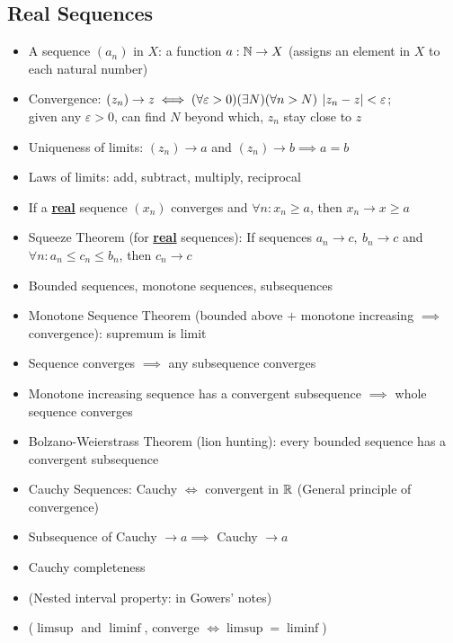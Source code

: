 \subsection*{Real Sequences}
\begin{itemize}
      \item A sequence $(a_n)$ in $X$: a function $a: \mathbb{N} \to X$ (assigns an element in $X$ to each natural number)
      \item Convergence: $(z_n) \to z \iff (\forall \varepsilon > 0)(\exists N)(\forall n>N) \: \left| z_n - z \right| < \varepsilon$; \\
            given any $\varepsilon > 0$, can find $N$ beyond which, $z_n$ stay close to $z$
      \item Uniqueness of limits: $(z_n) \to a$ and $(z_n) \to b \implies a = b$
      \item Laws of limits: add, subtract, multiply, reciprocal
      \item If a \underline{\textbf{real}} sequence $(x_n)$ converges and $ \forall n: x_n \geq a$, then $x_n \to x \geq a$
      \item Squeeze Theorem (for \underline{\textbf{real}} sequences): If sequences $a_n \to c , \: b_n \to c$ and $\forall n: a_n \leq c_n \leq b_n $, then $c_n \to c$
      \item Bounded sequences, monotone sequences, subsequences
      \item Monotone Sequence Theorem (bounded above $+$ monotone increasing $\implies$ convergence): supremum is limit
      \item Sequence converges $\implies$ any subsequence converges
      \item Monotone increasing sequence has a convergent subsequence $\implies$ whole sequence converges
      \item Bolzano-Weierstrass Theorem (lion hunting): every bounded sequence has a convergent subsequence
      \item Cauchy Sequences: Cauchy $\iff$ convergent in $\mathbb{R}$ (General principle of convergence)
      \item Subsequence of Cauchy $\to a \implies $ Cauchy $\to a$
      \item Cauchy completeness
      \item (Nested interval property: in Gowers' notes)
      \item ($\limsup$ and $\liminf$, converge $\iff \limsup = \liminf$)
\end{itemize}

